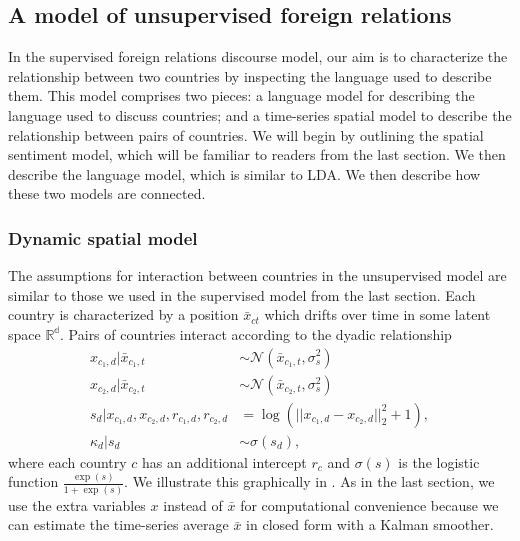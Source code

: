 \subsection{A model of unsupervised foreign relations}
In the supervised foreign relations discourse model, our aim is to
characterize the relationship between two countries by inspecting the
language used to describe them.  This model comprises two pieces: a
language model for describing the language used to discuss countries;
and a time-series spatial model to describe the relationship between
pairs of countries.  We will begin by outlining the spatial sentiment
model, which will be familiar to readers from the last section.  We
then describe the language model, which is similar to LDA.  We then
describe how these two models are connected.

\subsubsection*{Dynamic spatial model}
The assumptions for interaction between countries in the unsupervised
model are similar to those we used in the supervised model from the
last section.  Each country is characterized by a position $\bar
x_{ct}$ which drifts over time in some latent space $\mathbb{R^d}$.
Pairs of countries interact according to the dyadic relationship
\begin{align}
  x_{c_1,d} | \bar x_{c_1,t} & \sim \mathcal{N}(\bar x_{c_1, t}, \sigma_s^2) \nonumber \\
  x_{c_2,d} | \bar x_{c_2,t} & \sim \mathcal{N}(\bar x_{c_2, t}, \sigma_s^2) \nonumber \\
  s_d | x_{c_1,d}, x_{c_2,d}, r_{c_1,d}, r_{c_2,d} & = \log( || x_{c_1,d} - x_{c_2,d} ||_2^2 + 1), \nonumber \\
  \kappa_d | s_d & \sim \sigma(s_d),
\end{align}
where each country $c$ has an additional intercept $r_c$ and
$\sigma(s)$ is the logistic function $\frac{\exp(s)}{1 + \exp(s)}$.
We illustrate this graphically in .  As in the
last section, we use the extra variables $x$ instead of $\bar x$ for
computational convenience because we can estimate the time-series
average $\bar x$ in closed form with a Kalman smoother.

